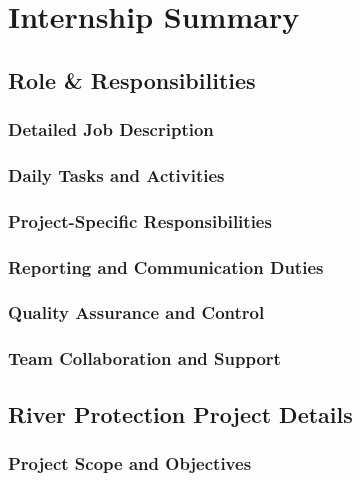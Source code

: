 
\chapter{Internship Summary}

\section{Role \& Responsibilities}

\subsection{Detailed Job Description}

\subsection{Daily Tasks and Activities}

\subsection{Project-Specific Responsibilities}

\subsection{Reporting and Communication Duties}

\subsection{Quality Assurance and Control}

\subsection{Team Collaboration and Support}

\section{River Protection Project Details}

\subsection{Project Scope and Objectives}


